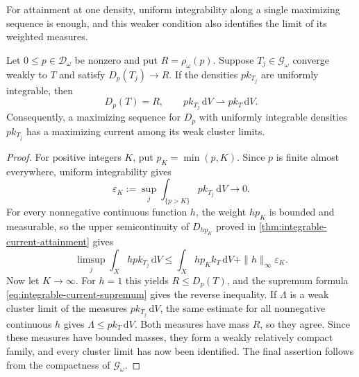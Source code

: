 For attainment at one density, uniform integrability along a single maximizing sequence is enough, and this weaker condition also identifies the limit of its weighted measures.

\begin{proposition}\label{prop:selected-gauduchon-attainment}
Let $0\leq p\in\mathcal D_\omega$ be nonzero and put $R=\rho_\omega(p)$. Suppose $T_j\in\mathscr G_\omega$ converge weakly to $T$ and satisfy $D_p(T_j)\to R$. If the densities $p k_{T_j}$ are uniformly integrable, then
\[
 D_p(T)=R,\qquad
 p k_{T_j}\,\mathrm{d}V\rightharpoonup p k_T\,\mathrm{d}V.
\]
Consequently, a maximizing sequence for $D_p$ with uniformly integrable densities $pk_{T_j}$ has a maximizing current among its weak cluster limits.
\end{proposition}
\begin{proof}
For positive integers $K$, put $p_K=\min(p,K)$. Since $p$ is finite almost everywhere, uniform integrability gives
\[
 \varepsilon_K:=\sup_j\int_{\{p>K\}}p k_{T_j}\,\mathrm{d}V
       \longrightarrow0.
\]
For every nonnegative continuous function $h$, the weight $hp_K$ is bounded and measurable, so the upper semicontinuity of $D_{hp_K}$ proved in \cref{thm:integrable-current-attainment} gives
\[
 \limsup_j\int_Xhp k_{T_j}\,\mathrm{d}V
 \leq \int_Xhp_K k_T\,\mathrm{d}V
                   +\|h\|_\infty\varepsilon_K.
\]
Now let $K\to\infty$. For $h=1$ this yields $R\leq D_p(T)$, and the supremum formula \eqref{eq:integrable-current-supremum} gives the reverse inequality. If $\Lambda$ is a weak cluster limit of the measures $p k_{T_j}\,\mathrm{d}V$, the same estimate for all nonnegative continuous $h$ gives $\Lambda\leq p k_T\,\mathrm{d}V$. Both measures have mass $R$, so they agree. Since these measures have bounded masses, they form a weakly relatively compact family, and every cluster limit has now been identified. The final assertion follows from the compactness of $\mathscr G_\omega$.
\end{proof}
